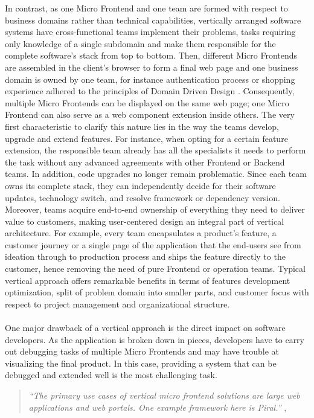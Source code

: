 \documentclass[a4paper]{book}
\begin{document}
In contrast, as one Micro Frontend and one team are formed with respect to business domains rather than technical capabilities, vertically arranged software systems have cross-functional teams implement their problems, tasks requiring only knowledge of a single subdomain and make them responsible for the complete software’s stack from top to bottom. Then, different Micro Frontends are assembled in the client’s browser to form a final web page and one business domain is owned by one team, for instance authentication process or shopping experience adhered to the principles of Domain Driven Design \cite{DDD}. Consequently, multiple Micro Frontends can be displayed on the same web page; one Micro Frontend can also serve as a web component extension inside others. The very first characteristic to clarify this nature lies in the way the teams develop, upgrade and extend features. For instance, when opting for a certain feature extension, the responsible team already has all the specialists it needs to perform the task without any advanced agreements with other Frontend or Backend teams. In addition, code upgrades no longer remain problematic. Since each team owns its complete stack, they can independently decide for their software updates, technology switch, and resolve framework or dependency version. Moreover, teams acquire end-to-end ownership of everything they need to deliver value to customers, making user-centered design an integral part of vertical architecture. For example, every team encapsulates a product's feature, a customer journey or a single page of the application that the end-users see from ideation through to production process and ships the feature directly to the customer, hence removing the need of pure Frontend or operation teams. Typical vertical approach offers remarkable benefits in terms of features development optimization, split of problem domain into smaller parts, and customer focus with respect to project management and organizational structure. \cite{Gee20}
\\
\\
One major drawback of a vertical approach is the direct impact on software developers. As the application is broken down in pieces, developers have to carry out debugging tasks of multiple Micro Frontends and may have trouble at visualizing the final product. In this case, providing a system that can be debugged and extended well is the most challenging task. \cite{Rap20}
\begin{quote}
    \textit{“The primary use cases of vertical micro frontend solutions are large web applications and web portals. One example framework here is Piral.”} \cite{Piral}, \cite{Rap20}
\end{quote}
\end{document}
